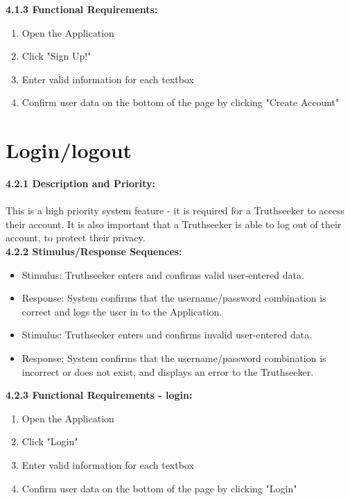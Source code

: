     \quad \textbf{4.1.3 \quad Functional Requirements:}
    \begin{enumerate}
        \item Open the Application
        \item Click "Sign Up!"
        \item Enter valid information for each textbox
        \item Confirm user data on the bottom of the page by clicking "Create Account"
    \end{enumerate}

\section{Login/logout}
    \quad \textbf{4.2.1 \quad Description and Priority:}\\ \\
    \null \quad This is a high priority system feature - it is required for a Truthseeker to access their account. It is also important that a Truthseeker is able to log out of their account, to protect their privacy. \\
    
    \quad \textbf{4.2.2 \quad Stimulus/Response Sequences:}
    \begin{itemize}
    \item[] Stimulus: \thinspace \quad Truthseeker enters and confirms valid user-entered data.
    \item[] Response: \quad System confirms that the username/password combination is correct and logs the user in to the Application.
    \item[] Stimulus: \quad Truthseeker enters and confirms invalid user-entered data.
    \item[] Response: \quad System confirms that the username/password combination is incorrect or does not exist, and displays an error to the Truthseeker.
    \end{itemize}
    
    \quad \textbf{4.2.3 \quad Functional Requirements - login:}
    \begin{enumerate}
        \item Open the Application
        \item Click "Login"
        \item Enter valid information for each textbox
        \item Confirm user data on the bottom of the page by clicking "Login"
    \end{enumerate}
    
